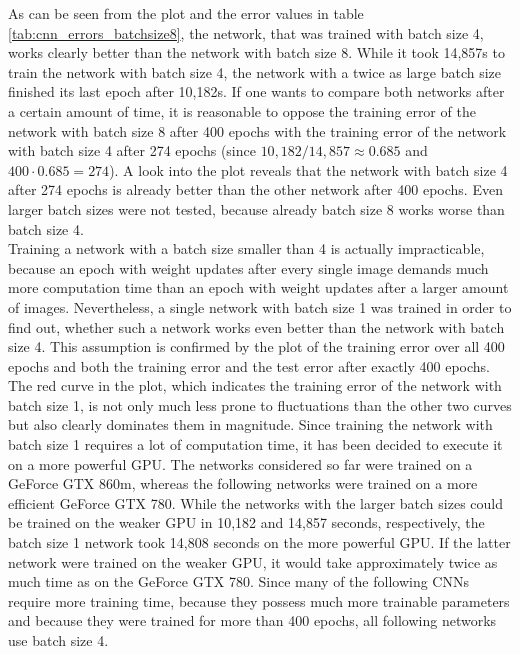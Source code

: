 \documentclass[11pt, a4paper]{article}
\begin{document}
As can be seen from the plot and the error values in table \ref{tab:cnn_errors_batchsize8}, the network, that was trained with batch size 4, works clearly better than the network with batch size 8. While it took 14,857s to train the network with batch size 4, the network with a twice as large batch size finished its last epoch after 10,182s. If one wants to compare both networks after a certain amount of time, it is reasonable to oppose the training error of the network with batch size 8 after 400 epochs with the training error of the network with batch size 4 after 274 epochs (since $10,182 / 14,857 \approx 0.685$ and $400 \cdot 0.685 = 274$). A look into the plot reveals that the network with batch size 4 after 274 epochs is already better than the other network after 400 epochs. Even larger batch sizes were not tested, because already batch size 8 works worse than batch size 4.\\
Training a network with a batch size smaller than 4 is actually impracticable, because an epoch with weight updates after every single image demands much more computation time than an epoch with weight updates after a larger amount of images. Nevertheless, a single network with batch size 1 was trained in order to find out, whether such a network works even better than the network with batch size 4. This assumption is confirmed by the plot of the training error over all 400 epochs and both the training error and the test error after exactly 400 epochs. The red curve in the plot, which indicates the training error of the network with batch size 1, is not only much less prone to fluctuations than the other two curves but also clearly dominates them in magnitude. Since training the network with batch size 1 requires a lot of computation time, it has been decided to execute it on a more powerful \ac{GPU}. The networks considered so far were trained on a GeForce GTX 860m, whereas the following networks were trained on a more efficient GeForce GTX 780. While the networks with the larger batch sizes could be trained on the weaker GPU in 10,182 and 14,857 seconds, respectively, the batch size 1 network took 14,808 seconds on the more powerful GPU. If the latter network were trained on the weaker GPU, it would take approximately twice as much time as on the GeForce GTX 780. Since many of the following \acp{CNN} require more training time, because they possess much more trainable parameters and because they were trained for more than 400 epochs, all following networks use batch size 4.

\end{document}
